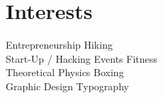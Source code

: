 \documentclass[a4paper]{deedy-resume-proximanova-sanfran} %
\begin{document}
\begin{minipage}[t]{0.33\textwidth}
\sectionspace %


\section{Interests}
Entrepreneurship \textbullet{} Hiking \\
Start-Up / Hacking Events \textbullet{} Fitness \\
Theoretical Physics \textbullet{} Boxing \\
Graphic Design \textbullet{} Typography \\


\end{minipage} %
\hfill
%
%
\end{document}

